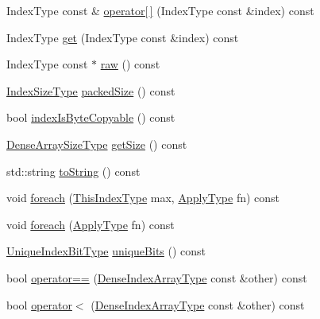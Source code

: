 \begin{DoxyCompactItemize}
Index\+Type const  \& \hyperlink{structvt_1_1index_1_1_dense_index_array_ac46f5310e8a39ad248ab55b71d60eac0}{operator\mbox{[}$\,$\mbox{]}} (Index\+Type const \&index) const
\item 
Index\+Type \hyperlink{structvt_1_1index_1_1_dense_index_array_aab1b5d089af92c070f2327bc15006251}{get} (Index\+Type const \&index) const
\item 
Index\+Type const  $\ast$ \hyperlink{structvt_1_1index_1_1_dense_index_array_a2bde995d206bb72e0f5973a78e100eea}{raw} () const
\item 
\hyperlink{structvt_1_1index_1_1_dense_index_array_ae2999552165f16fc69a2940e0589819f}{Index\+Size\+Type} \hyperlink{structvt_1_1index_1_1_dense_index_array_aaf03d65faf2c1916de7309f2602ee13a}{packed\+Size} () const
\item 
bool \hyperlink{structvt_1_1index_1_1_dense_index_array_a2c47c2a4cb636879e03281d185e19fad}{index\+Is\+Byte\+Copyable} () const
\item 
\hyperlink{structvt_1_1index_1_1_dense_index_array_a7a66b5cd270377310119da3d0c884224}{Dense\+Array\+Size\+Type} \hyperlink{structvt_1_1index_1_1_dense_index_array_a96f8e639c73347b326a31a750a0f9e2d}{get\+Size} () const
\item 
std\+::string \hyperlink{structvt_1_1index_1_1_dense_index_array_a102b9fa9d7a34a9a6630ab89eb9d8a7f}{to\+String} () const
\item 
void \hyperlink{structvt_1_1index_1_1_dense_index_array_abe8fc4be882d51e37404e44e87da5caa}{foreach} (\hyperlink{structvt_1_1index_1_1_dense_index_array_a6915511f6a82dff2522d6e8c2be20f2a}{This\+Index\+Type} max, \hyperlink{structvt_1_1index_1_1_dense_index_array_ab44b9e5a65d28520268523fbe99f6a9d}{Apply\+Type} fn) const
\item 
void \hyperlink{structvt_1_1index_1_1_dense_index_array_ab4306357a93fe2e34179d6a907f31782}{foreach} (\hyperlink{structvt_1_1index_1_1_dense_index_array_ab44b9e5a65d28520268523fbe99f6a9d}{Apply\+Type} fn) const
\item 
\hyperlink{namespacevt_a913e1f07b5228dd8bb64040dc6dcea14}{Unique\+Index\+Bit\+Type} \hyperlink{structvt_1_1index_1_1_dense_index_array_a41531f28f011127ee1714452dd4debef}{unique\+Bits} () const
\item 
bool \hyperlink{structvt_1_1index_1_1_dense_index_array_aa407d7e96709099c4a7ee179c65c627f}{operator==} (\hyperlink{structvt_1_1index_1_1_dense_index_array_aec95c4ed1b4071d31d24142f02429dbd}{Dense\+Index\+Array\+Type} const \&other) const
\item 
bool \hyperlink{structvt_1_1index_1_1_dense_index_array_a7d1d02c9c0a50822d63afeb3358a7a0f}{operator$<$} (\hyperlink{structvt_1_1index_1_1_dense_index_array_aec95c4ed1b4071d31d24142f02429dbd}{Dense\+Index\+Array\+Type} const \&other) const

\end{DoxyCompactItemize}
